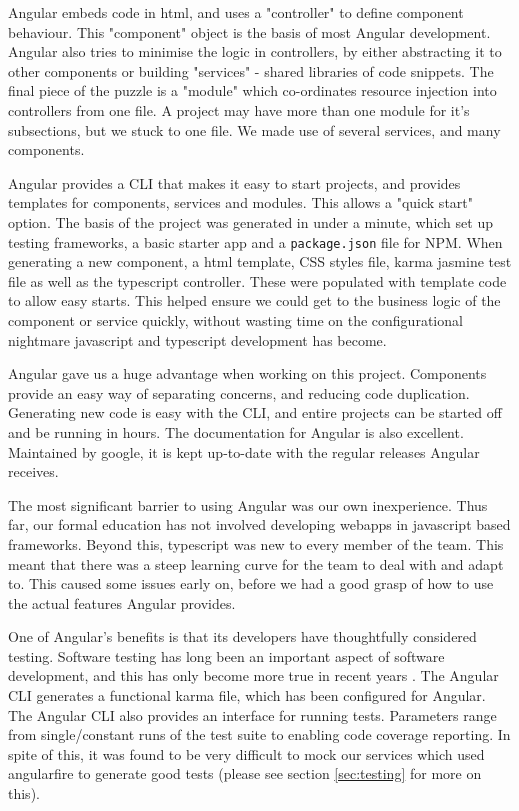 \documentclass{l3proj}
\begin{document}
Angular embeds code in html, and uses a "controller" to define component behaviour. This
 "component" object is the basis of most Angular development. Angular also tries
 to minimise the logic in controllers, by either abstracting it to other components
 or building "services" - shared libraries of code snippets. The final piece of the puzzle
 is a "module" which co-ordinates resource injection into controllers from one
 file. A project may have more than one module for it's subsections, but we stuck to
 one file. We made use of several services, and many components.

Angular provides a CLI that makes it easy to start projects, and provides
 templates for components, services and modules. This allows a "quick start"
 option. The basis of the project was generated in under a minute, which set up
 testing frameworks, a basic starter app and a \texttt{package.json} file for NPM.
 When generating a new component, a html template, CSS styles file, karma
 jasmine test file as well as the typescript controller. These were populated
 with template code to allow easy starts. This helped ensure we could get to
 the business logic of the component or service quickly, without wasting time
 on the configurational nightmare javascript and typescript development has
 become.

 

Angular gave us a huge advantage when working on this project. Components provide
 an easy way of separating concerns, and reducing code duplication. Generating new
 code is easy with the CLI, and entire projects can be started off and be running
 in hours. The documentation for Angular is also excellent. Maintained by google,
 it is kept up-to-date with the regular releases Angular receives.

The most significant barrier to using Angular was our own inexperience.
 Thus far, our formal education has not involved developing webapps in
 javascript based frameworks. Beyond this, typescript was new to every
 member of the team. This meant that there was a steep learning curve for
 the team to deal with and adapt to. This caused some issues early on,
 before we had a good grasp of how to use the actual features Angular
 provides.

One of Angular's benefits is that its developers have thoughtfully
 considered testing. Software testing has long been an important
 aspect of software development, and this has only become more true
 in recent years \cite{tuteja2012testing}. The Angular CLI generates
 a functional karma file, which has been configured for Angular. The
 Angular CLI also provides an interface for running tests. Parameters
 range from single/constant runs of the test suite to enabling code
 coverage reporting. In spite of this, it was found to be very
 difficult to mock our services which used angularfire to generate
 good tests (please see section \ref{sec:testing} for more on this).
\end{document}
